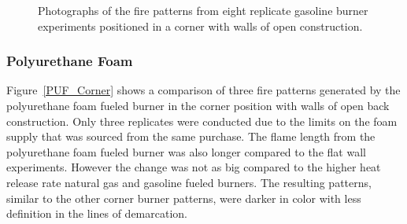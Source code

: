\documentclass[twoside]{uocthesis}
\begin{document}
{\begin{figure}[p]
	\caption[Photographs of the fire patterns from eight replicate gasoline burner experiments positioned in a corner]{Photographs of the fire patterns from eight replicate gasoline burner experiments positioned in a corner with walls of open construction.}
	\label{Gas_Corner}
\end{figure}

\subsubsection{Polyurethane Foam}

Figure~\ref{PUF_Corner} shows a comparison of three fire patterns generated by the polyurethane foam fueled burner in the corner position with walls of open back construction. Only three replicates were conducted due to the limits on the foam supply that was sourced from the same purchase.  The flame length from the polyurethane foam fueled burner was also longer compared to the flat wall experiments.  However the change was not as big compared to the higher heat release rate natural gas and gasoline fueled burners.  The resulting patterns, similar to the other corner burner patterns, were darker in color with less definition in the lines of demarcation.       

}
\end{document}
